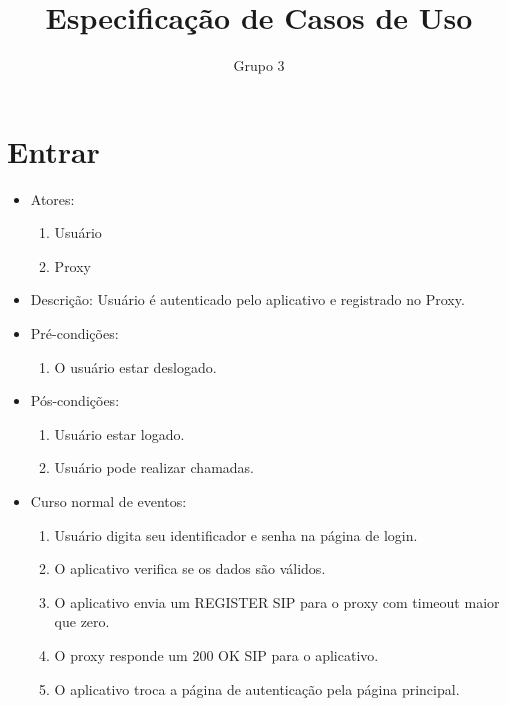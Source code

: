 \documentclass[12pt,a4paper]{article}
\author{Grupo 3}
\title{Especifica\c{c}\~{a}o de Casos de Uso}
\begin{document}
\maketitle

\section{Entrar}
\begin{itemize}
	\item Atores:
	\begin{enumerate}
		\item Usu\'{a}rio
		\item Proxy
	\end{enumerate}
	\item Descri\c{c}\~{a}o:
        Usu\'{a}rio \'{e} autenticado pelo aplicativo e registrado no Proxy.
	\item Pr\'{e}-condi\c{c}\~{o}es:
	\begin{enumerate}
		\item O usu\'{a}rio estar deslogado.
	\end{enumerate}
	\item P\'{o}s-condi\c{c}\~{o}es:
	\begin{enumerate}
		\item Usu\'{a}rio estar logado.
        \item Usu\'{a}rio pode realizar chamadas.
	\end{enumerate}
	\item Curso normal de eventos:
	\begin{enumerate}
		\item Usu\'{a}rio digita seu identificador e senha na p\'{a}gina de login.
        \item O aplicativo verifica se os dados s\~{a}o v\'{a}lidos.
        \item O aplicativo envia um REGISTER SIP para o proxy com timeout maior que zero.
        \item O proxy responde um 200 OK SIP para o aplicativo.
        \item O aplicativo troca a p\'{a}gina de autentica\c{c}\~{a}o pela p\'{a}gina principal.
	\end{enumerate}	
\end{itemize}
\end{document}
